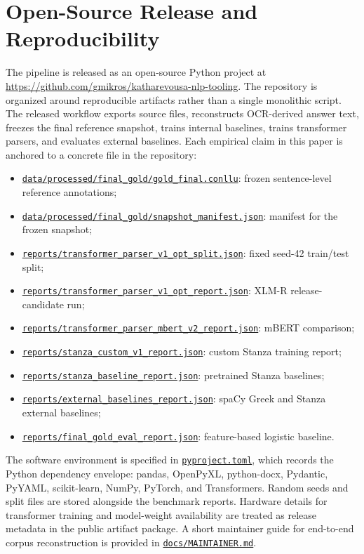 \documentclass[11pt]{article}
\newcommand{\repobase}{https://github.com/gmikros/katharevousa-nlp-tooling}
\newcommand{\repofile}[1]{\href{\repobase/blob/main/#1}{\nolinkurl{#1}}}
\begin{document}
\section{Open-Source Release and Reproducibility}

The pipeline is released as an open-source Python project at \url{\repobase}. The repository is organized around reproducible artifacts rather than a single monolithic script. The released workflow exports source files, reconstructs OCR-derived answer text, freezes the final reference snapshot, trains internal baselines, trains transformer parsers, and evaluates external baselines. Each empirical claim in this paper is anchored to a concrete file in the repository:

\begin{itemize}[leftmargin=1.5em]
  \item \repofile{data/processed/final_gold/gold_final.conllu}: frozen sentence-level reference annotations;
  \item \repofile{data/processed/final_gold/snapshot_manifest.json}: manifest for the frozen snapshot;
  \item \repofile{reports/transformer_parser_v1_opt_split.json}: fixed seed-42 train/test split;
  \item \repofile{reports/transformer_parser_v1_opt_report.json}: XLM-R release-candidate run;
  \item \repofile{reports/transformer_parser_mbert_v2_report.json}: mBERT comparison;
  \item \repofile{reports/stanza_custom_v1_report.json}: custom Stanza training report;
  \item \repofile{reports/stanza_baseline_report.json}: pretrained Stanza baselines;
  \item \repofile{reports/external_baselines_report.json}: spaCy Greek and Stanza external baselines;
  \item \repofile{reports/final_gold_eval_report.json}: feature-based logistic baseline.
\end{itemize}

The software environment is specified in \repofile{pyproject.toml}, which records the Python dependency envelope: pandas, OpenPyXL, python-docx, Pydantic, PyYAML, scikit-learn, NumPy, PyTorch, and Transformers. Random seeds and split files are stored alongside the benchmark reports. Hardware details for transformer training and model-weight availability are treated as release metadata in the public artifact package. A short maintainer guide for end-to-end corpus reconstruction is provided in \repofile{docs/MAINTAINER.md}.
\end{document}

